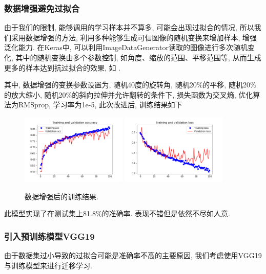 \documentclass[lang=cn,11pt]{elegantpaper}
\begin{document}
\subsubsection{数据增强避免过拟合}

由于我们的限制, 能够调用的学习样本并不算多, 可能会出现过拟合的情况, 所以我们采用数据增强的方法, 利用多种能够生成可信图像的随机变换来增加样本, 增强泛化能力.  在Keras中, 可以利用ImageDataGenerator读取的图像进行多次随机变化, 其中的随机变换由多个参数控制, 如角度、缩放的范围、平移范围等, 从而生成更多的样本达到抗过拟合的效果, 如 .

其中, 数据增强的变换参数设置为, 随机40度的旋转角, 随机20\%的平移, 随机20\%的放大缩小, 随机20\%的斜向拉伸并允许翻转的条件下, 损失函数为交叉熵, 优化算法为RMSprop, 学习率为1e-5, 此次改进后, 训练结果如下
\begin{figure}[htbp]
	\centering
	  \includegraphics[width=0.45\textwidth]{small_aug_1.png}
	  \includegraphics[width=0.45\textwidth]{small_aug_2.png}
	  \caption{数据增强后的训练结果.}
	\end{figure}

此模型实现了在测试集上81.8\%的准确率. 表现不错但是依然不尽如人意.

\subsubsection{引入预训练模型VGG19}
由于数据集过小导致的过拟合可能是准确率不高的主要原因, 我们考虑使用VGG19与训练模型来进行迁移学习. 
\end{document}
